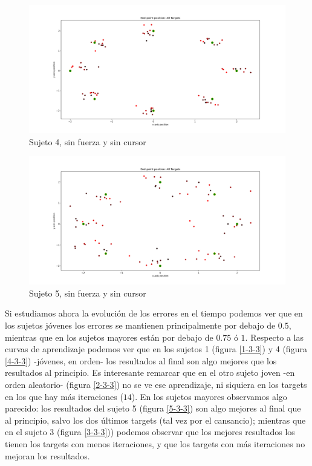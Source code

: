 \documentclass[a4paper,11pt, oneside]{book}
\begin{document}
\begin{figure}[H]
	\includegraphics[width=\linewidth]{sujeto4/no_force_no_cursor/trayectorias_puntos}
	\caption{Sujeto 4, sin  fuerza y sin cursor}
	\label{4-3-2}
\end{figure}
\begin{figure}[H]
	\includegraphics[width=\linewidth]{sujeto5/no_force_no_cursor/trayectorias_puntos}
	\caption{Sujeto 5, sin  fuerza y sin cursor}
	\label{5-3-2}
\end{figure}



Si estudiamos ahora la evolución de los errores en el tiempo podemos ver que en los sujetos jóvenes los errores se mantienen principalmente por debajo de $0.5$, mientras que en los sujetos mayores están por debajo de $0.75$ ó $1$. Respecto a las curvas de aprendizaje podemos ver que en los sujetos 1 (figura \ref{1-3-3}) y 4 (figura \ref{4-3-3}) -jóvenes, en orden- los resultados al final son algo mejores que los resultados al principio. Es interesante remarcar que en el otro sujeto joven -en orden aleatorio- (figura \ref{2-3-3}) no se ve ese aprendizaje, ni siquiera en los targets en los que hay más iteraciones ($14$). En los sujetos mayores observamos algo parecido: los resultados del sujeto 5 (figura \ref{5-3-3}) son algo mejores al final que al principio, salvo los dos últimos targets (tal vez por el cansancio); mientras que en el sujeto 3 (figura \ref{3-3-3})) podemos observar que los mejores resultados los tienen los targets con menos iteraciones, y que los targets con más iteraciones no mejoran los resultados.
\end{document}
